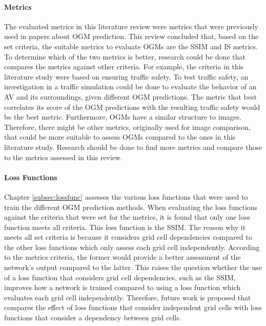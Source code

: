 \paragraph{Metrics}
The evaluated metrics in this literature review were metrics that were previously used in papers about \gls{OGM} prediction. This review concluded that, based on the set criteria, the suitable metrics to evaluate \glspl{OGM} are the \gls{SSIM} and \gls{IS} metrics. To determine which of the two metrics is better, research could be done that compares the metrics against other criteria. For example, the criteria in this literature study were based on ensuring traffic safety. To test traffic safety, an investigation in a traffic simulation could be done to evaluate the behavior of an \gls{AV} and its surroundings, given different \gls{OGM} predictions. The metric that best correlates its score of the \gls{OGM} predictions with the resulting traffic safety would be the best metric. 
Furthermore, \glspl{OGM} have a similar structure to images. Therefore, there might be other metrics, originally used for image comparison, that could be more suitable to assess \glspl{OGM} compared to the ones in this literature study. Research should be done to find more metrics and compare those to the metrics assessed in this review. 

\paragraph{Loss Functions}
Chapter \ref{subsec:lossfunc} assesses the various loss functions that were used to train the different \gls{OGM} prediction methods. When evaluating the loss functions against the criteria that were set for the metrics, it is found that only one loss function meets all criteria. This loss function is the \gls{SSIM}. The reason why it meets all set criteria is because it considers grid cell dependencies compared to the other loss functions which only assess each grid cell independently. According to the metrics criteria, the former would provide a better assessment of the network's output compared to the latter. This raises the question whether the use of a loss function that considers grid cell dependencies, such as the \gls{SSIM}, improves how a network is trained compared to using a loss function which evaluates each grid cell independently. Therefore, future work is proposed that compares the effect of loss functions that consider independent grid cells with loss functions that consider a dependency between grid cells. 


